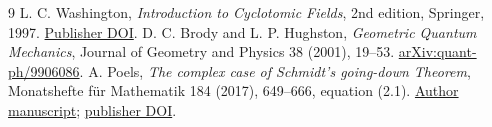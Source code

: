 \documentclass[11pt,a4paper]{article}
\begin{document}
\begin{thebibliography}{9}
 L. C. Washington, \emph{Introduction to
Cyclotomic Fields}, 2nd edition, Springer, 1997.
\href{https://doi.org/10.1007/978-1-4612-1934-7}{Publisher DOI}.
 D. C. Brody and L. P. Hughston, \emph{Geometric
Quantum Mechanics}, Journal of Geometry and Physics 38 (2001),
19--53. \href{https://arxiv.org/abs/quant-ph/9906086}{arXiv:quant-ph/9906086}.
 A. Poels, \emph{The complex case of Schmidt's
going-down Theorem}, Monatshefte für Mathematik 184 (2017),
649--666, equation (2.1).
\href{https://www.apoels-math-u.net/pdf/note_going_down.pdf}{Author manuscript};
\href{https://doi.org/10.1007/s00605-017-1084-4}{publisher DOI}.
\end{thebibliography}
\end{document}
